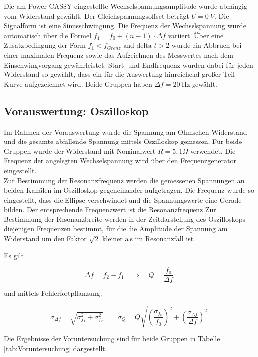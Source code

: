 \documentclass[12pt,a4paper]{article}
\begin{document}
Die am Power-CASSY eingestellte Wechselspannungsamplitude wurde abhängig vom Widerstand gewählt. Der Gleichspannungsoffset beträgt $U = \SI{0}{V}$. Die Signalform ist eine Sinusschwingung.
Die Frequenz der Wechselspannung wurde automatisch über die Formel $f_1 = f_0 +(n-1) \cdot \Delta f$ variiert. Über eine Zusatzbedingung der Form $f_1 < f_{Grenz} \text{ and delta } t > 2$ wurde ein Abbruch bei einer maximalen Frequenz sowie das Aufzeichnen des Messwertes nach dem Einschwingvorgang gewährleistet.  Start- und Endfrequenz wurden dabei für jeden Widerstand so gewählt, dass ein für die Auswertung hinreichend großer Teil Kurve aufgezeichnet wird. Beide Gruppen haben $\Delta f = \SI{20}{\Hz}$ gewählt.

\subsection{Vorauswertung: Oszilloskop}
Im Rahmen der Vorauswertung wurde die Spannung am Ohmschen Widerstand und die gesamte abfallende Spannung mittels Oszilloskop gemessen. Für beide Gruppen wurde der Widerstand mit Nominalwert $R = 5,1 \Omega$ verwendet. Die Frequenz der angelegten Wechselspannung wird über den Frequenzgenerator eingestellt.\\

Zur Bestimmung der Resonanzfrequenz werden die gemessenen Spannungen an beiden Kanälen im Oszilloskop gegeneinander aufgetragen. Die Frequenz wurde so eingestellt, dass die Ellipse verschwindet und die Spannungswerte eine Gerade bilden. Der entsprechende Frequenzwert ist die Resonanzfrequenz
Zur Bestimmung der Resonanzbreite werden in der Zeitdarstellung des Oszilloskops diejenigen Frequenzen bestimmt, für die die Amplitude der Spannung am Widerstand um den Faktor $\sqrt{2}$ kleiner als im Resonanzfall ist. 

Es gilt

\begin{equation}
\Delta f = f_2 - f_1 \quad \Rightarrow \quad Q = \frac{f_0}{\Delta f}
\end{equation}

und mittels Fehlerfortpflanzung:

\begin{equation}
\sigma_{\Delta f} = \sqrt{\sigma_{f_1}^2+\sigma_{f_2}^2} \qquad \sigma_Q = Q \sqrt{\left(\frac{\sigma_{f_0}}{f_0}\right)^2 + \left(\frac{\sigma_{\Delta f}}{\Delta f}\right)^2}
\end{equation}

Die Ergebnisse der Voruntersuchung sind für beide Gruppen in Tabelle \ref{tab:Voruntersuchung} dargestellt.
\end{document}
